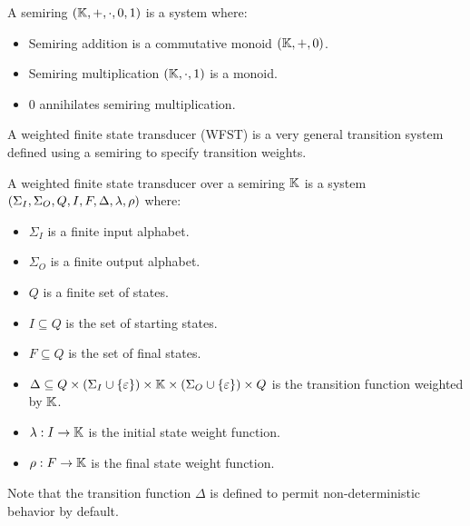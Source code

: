 \documentclass[12pt]{article}
\begin{document}
\begin{definition}[Semiring]
  A semiring \(\left(\mathbb{K}, +, \cdot, 0, 1\right)\) is a system where:

  \begin{itemize}
    \item
      Semiring addition is a commutative monoid
      \(\left(\mathbb{K}, +, 0\right)\).

    \item
      Semiring multiplication
      \(\left(\mathbb{K}, \cdot, 1\right)\) is a monoid.

    \item
      \(0\) annihilates semiring multiplication.
  \end{itemize}

\end{definition}

A weighted finite state transducer (WFST) is a very
general transition system defined
using a semiring to specify transition weights.


\begin{definition}
  A weighted finite state transducer over a semiring \(\mathbb{K}\) is
  a system
  \(\left(\Sigma_I, \Sigma_O, Q, I, F, \Delta, \lambda, \rho\right)\) where:

  \begin{itemize}
    \item
      \(\Sigma_I\) is a finite input alphabet.

    \item
      \(\Sigma_O\) is a finite output alphabet.

    \item
      \(Q\) is a finite set of states.

    \item
      \(I \subseteq Q\) is the set of starting states.

    \item
      \(F \subseteq Q\) is the set of final states.

    \item
      \(\Delta \subseteq
          Q \times
          \left(\Sigma_I \cup \left\{\varepsilon\right\}\right) \times
          \mathbb{K} \times
          \left(\Sigma_O \cup \left\{\varepsilon\right\}\right) \times
          Q \)
      is the transition function weighted by \(\mathbb{K}\).
        
    \item
      \(\lambda : I \to \mathbb{K}\) is the initial state weight function.

    \item
      \(\rho : F \to \mathbb{K}\) is the final state weight function.

    \end{itemize}

    Note that the transition function \(\Delta\) is defined to
    permit non-deterministic behavior by default.
\end{definition}
\end{document}
